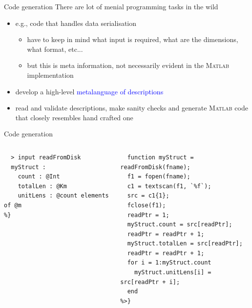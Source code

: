 \documentclass[]{beamer}
\newcommand{\keyword}[1]{\textcolor{blue}{#1}}
\newcommand{\ma}{\textsc{Matlab}}
\begin{document}
\begin{frame}{Code generation}
There are lot of menial programming tasks in the wild\pause
\begin{itemize}[<+->]
  \item e.g., code that handles data serialisation
  \begin{itemize}
    \item have to keep in mind what input is required, what are the dimensions, what format, etc...
    \item but this is meta information, not necessarily evident in the \ma{} implementation
  \end{itemize}
\end{itemize}
\pause
\begin{itemize}[<+->]
  \item develop a high-level \keyword{metalanguage of descriptions}
  \item read and validate descriptions, make sanity checks and generate \ma{} code that closely resembles hand crafted one
\end{itemize}
\end{frame}

\begin{frame}[fragile]{Code generation}
 \begin{columns}
   \begin{column}{0.45\textwidth}
    \begin{lstlisting}[basicstyle=\small]
%{
  > input readFromDisk
  myStruct :
    count : @Int
    totalLen : @Km
    unitLens : @count elements of @m
%}
    \end{lstlisting}
   \end{column}
   \begin{column}{0.45\textwidth}
   \begin{lstlisting}[basicstyle=\tiny]
%<{
  function myStruct = readFromDisk(fname);
  f1 = fopen(fname);
  c1 = textscan(f1, `%f`);
  src = c1{1};
  fclose(f1);
  readPtr = 1;
  myStruct.count = src[readPtr];
  readPtr = readPtr + 1;
  myStruct.totalLen = src[readPtr];
  readPtr = readPtr + 1;
  for i = 1:myStruct.count
    myStruct.unitLens[i] = src[readPtr + i];
  end
%>}
   \end{lstlisting}
   \end{column}
 \end{columns}
\end{frame}
\end{document}
